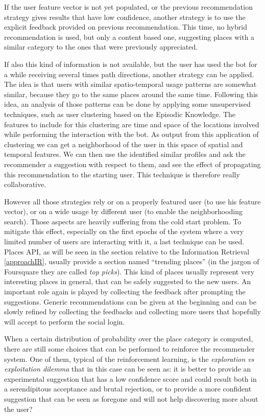 If the user feature vector is not yet populated, or the previous recommendation strategy gives results that have low confidence, another strategy is to use the explicit feedback provided on previous recommendation. This time, no hybrid recommendation is used, but only a content based one, suggesting places with a similar category to the ones that were previously appreciated.

If also this kind of information is not available, but the user has used the bot for a while receiving several times path directions, another strategy can be applied. The idea is that users with similar spatio-temporal usage patterns are somewhat similar, because they go to the same places around the same time. Following this idea, an analysis of those patterns can be done by applying some unsupervised techniques, such as user clustering based on the Episodic Knowledge. The features to include for this clustering are time and space of the locations involved while performing the interaction with the bot. As output from this application of clustering we can get a neighborhood of the user in this space of spatial and temporal features. We can then use the identified similar profiles and ask the recommender a suggestion with respect to them, and see the effect of propagating this recommendation to the starting user. This technique is therefore really collaborative.

However all those strategies rely or on a properly featured user (to use his feature vector), or on a wide usage by different user (to enable the neighborhooding search). Those aspects are heavily suffering from the cold start problem. To mitigate this effect, especially on the first epochs of the system where a very limited number of users are interacting with it, a last technique can be used. Places API, as will be seen in the section relative to the Information Retrieval \ref{approachIR}, usually provide a section named ``trending places'' (in the jargon of Foursquare they are called \textit{top picks}). This kind of places usually represent very interesting places in general, that can be safely suggested to the new users. An important role again is played by collecting the feedback after prompting the suggestions. Generic recommendations can be given at the beginning and can be slowly refined by collecting the feedbacks and collecting more users that hopefully will accept to perform the social login.

When a certain distribution of probability over the place category is computed, there are still some choices that can be performed to reinforce the recommender system. One of them, typical of the reinforcement learning, is the \textit{exploration vs exploitation dilemma} that in this case can be seen as: it is better to provide an experimental suggestion that has a low confidence score and could result both in a serendipitous acceptance and brutal rejection, or to provide a more confident suggestion that can be seen as foregone and will not help discovering more about the user? 

